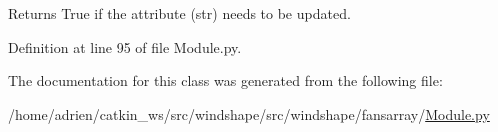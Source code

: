 \begin{DoxyVerb}Returns True if the attribute (str) needs to be updated.\end{DoxyVerb}
 

Definition at line 95 of file Module.\+py.



The documentation for this class was generated from the following file\+:\begin{DoxyCompactItemize}
\item 
/home/adrien/catkin\+\_\+ws/src/windshape/src/windshape/fansarray/\mbox{\hyperlink{_module_8py}{Module.\+py}}\end{DoxyCompactItemize}
